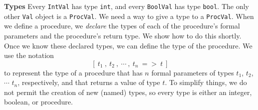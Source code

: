 \begin{minipage}[t]{\sw}
\slidenumber
\LARGE
{\bf Types}\exx
Every \verb'IntVal' has type \verb'int',
and every \verb'BoolVal' has type \verb'bool'.
The only other \verb'Val' object is a \verb'ProcVal'.
We need a way to give a type to a \verb'ProcVal'.\exx
When we define a procedure, we {\em declare} the types
of each of the procedure's formal parameters
and the procedure's return type.
We show how to do this shortly.
Once we know these declared types,
we can define the type of the procedure.\exx
We use the notation
\[ [\ t_1\ ,\ t_2\ ,\ \cdots\ ,\ t_n\ =>\ t\ ] \]
to represent the type of a procedure
that has $n$ formal parameters of types $t_1$, $t_2$, $\cdots$ $t_n$,
respectively, and that returns a value of type $t$.\exx
To simplify things, we do not permit the creation
of new (named) types,
so every type is either an integer, boolean, or procedure.
\end{minipage}

